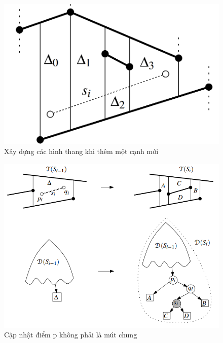 \documentclass[a4paper,12pt]{report}
\begin{document}
\begin{figure}[H]
\centering
\includegraphics[scale=0.28]{trmap2.png}
\caption{Xây dựng các hình thang khi thêm một cạnh mới}
\label{object_pic}
\end{figure}


\begin{figure}[H]
\centering
\includegraphics[scale=0.4]{updateT.png}
\caption{Cập nhật điểm p không phải là mút chung}
\label{object_pic}
\end{figure}
\end{document}
